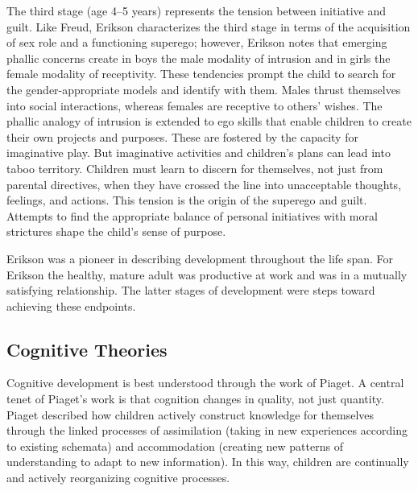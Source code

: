 The third stage (age 4–5 years) represents the tension between initiative and
guilt. Like Freud, Erikson characterizes the third stage in terms of the
acquisition of sex role and a functioning superego; however, Erikson notes that
emerging phallic concerns create in boys the male modality of intrusion and in
girls the female modality of receptivity. These tendencies prompt the child to
search for the gender-appropriate models and identify with them. Males thrust
themselves into social interactions, whereas females are receptive to others’
wishes. The phallic analogy of intrusion is extended to ego skills that enable
children to create their own projects and purposes. These are fostered by the
capacity for imaginative play. But imaginative activities and children’s plans
can lead into taboo territory. Children must learn to discern for themselves,
not just from parental directives, when they have crossed the line into
unacceptable thoughts, feelings, and actions. This tension is the origin of the
superego and guilt. Attempts to find the appropriate balance of personal
initiatives with moral strictures shape the child’s sense of purpose.
\cite{Feldman3}

Erikson was a pioneer in describing development throughout the life span. For
Erikson the healthy, mature adult was productive at work and was in a mutually
satisfying relationship. The latter stages of development were steps toward
achieving these endpoints. \cite{Feldman3}

\subsection{Cognitive Theories}
Cognitive development is best understood through the work of Piaget. A central
tenet of Piaget’s work is that cognition changes in quality, not just quantity.
Piaget described how children actively construct knowledge for themselves
through the linked processes of assimilation (taking in new experiences
according to existing schemata) and accommodation (creating new patterns of
understanding to adapt to new information). In this way, children are
continually and actively reorganizing cognitive processes. \cite{Nelson19}


